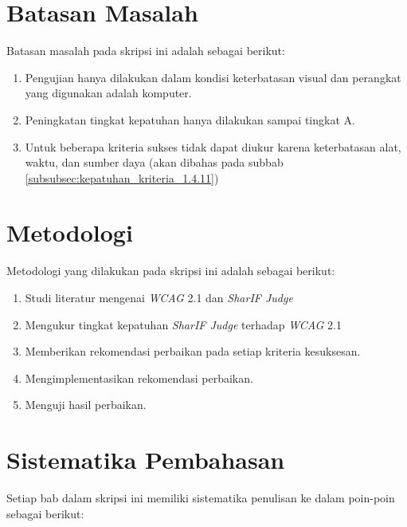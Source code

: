 \section{Batasan Masalah}
\label{sec:batasan}
Batasan masalah pada skripsi ini adalah sebagai berikut:

\begin{enumerate}
	\item Pengujian hanya dilakukan dalam kondisi keterbatasan visual dan perangkat yang digunakan adalah komputer.
	\item Peningkatan tingkat kepatuhan hanya dilakukan sampai tingkat A.
	\item Untuk beberapa kriteria sukses tidak dapat diukur karena keterbatasan alat, waktu, dan sumber daya (akan dibahas pada subbab \ref{subsubsec:kepatuhan_kriteria_1.4.11})
\end{enumerate}

\section{Metodologi}
\label{sec:metlit}
Metodologi yang dilakukan pada skripsi ini adalah sebagai berikut:

\begin{enumerate}
	\item Studi literatur mengenai \textit{WCAG} 2.1 dan \textit{SharIF Judge}
	\item Mengukur tingkat kepatuhan \textit{SharIF Judge} terhadap \textit{WCAG} 2.1
	\item Memberikan rekomendasi perbaikan pada setiap kriteria kesuksesan.
	\item Mengimplementasikan rekomendasi perbaikan.
	\item Menguji hasil perbaikan.
\end{enumerate}

\section{Sistematika Pembahasan}
\label{sec:sispem}
Setiap bab dalam skripsi ini memiliki sistematika penulisan ke dalam poin-poin sebagai berikut:

